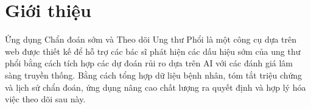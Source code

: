 \section{Giới thiệu}
Ứng dụng Chẩn đoán sớm và Theo dõi Ung thư Phổi là một công cụ dựa trên web được thiết kế để hỗ trợ các bác sĩ phát hiện các dấu hiệu sớm của ung thư phổi bằng cách tích hợp các dự đoán rủi ro dựa trên AI với các đánh giá lâm sàng truyền thống. Bằng cách tổng hợp dữ liệu bệnh nhân, tóm tắt triệu chứng và lịch sử chẩn đoán, ứng dụng nâng cao chất lượng ra quyết định và hợp lý hóa việc theo dõi sau này.
